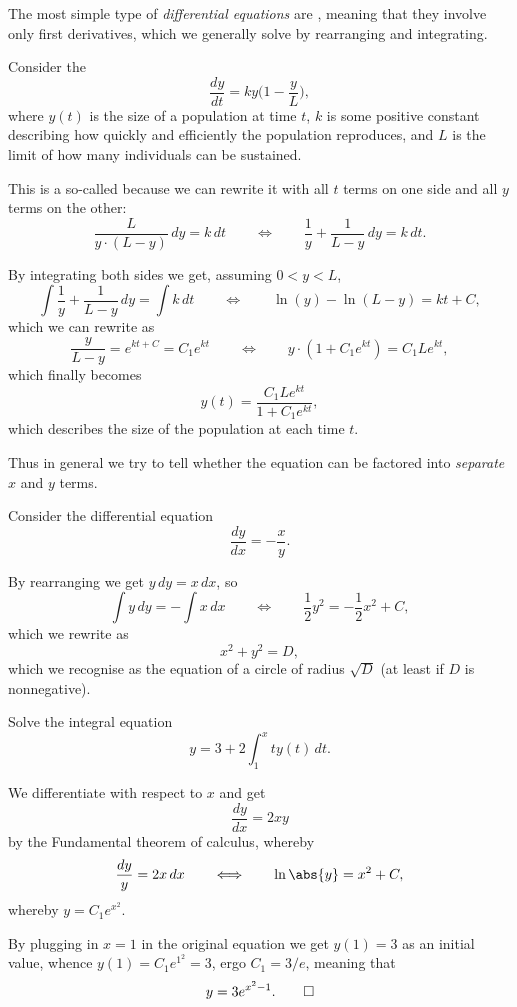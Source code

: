 

The most simple type of \emph{differential equations} are , meaning that they involve only first derivatives, which we generally solve by rearranging and integrating.

\begin{example}
	Consider the 
	\[
		\frac{d y}{d t} = k y \Big ( 1 - \frac{y}{L} \Big ),
	\]
	where $y(t)$ is the size of a population at time $t$, $k$ is some positive constant describing how quickly and efficiently the population reproduces, and $L$ is the limit of how many individuals can be sustained.

	This is a so-called  because we can rewrite it with all $t$ terms on one side and all $y$ terms on the other:
	\[
		\frac{L}{y \cdot (L - y)} \, d y = k \, d t \qquad \Longleftrightarrow \qquad \frac{1}{y} + \frac{1}{L - y} \, d y = k \, d t.
	\]

	\noindent
	By integrating both sides we get, assuming $0 < y < L$,
	\[
		\int \frac{1}{y} + \frac{1}{L - y} \, d y = \int k \, d t \qquad \Longleftrightarrow \qquad \ln(y) - \ln(L - y) = k t + C,
	\]
	which we can rewrite as
	\[
		\frac{y}{L - y} = e^{k t + C} = C_1 e^{k t} \qquad \Longleftrightarrow \qquad y \cdot (1 + C_1 e^{k t}) = C_1 L e^{k t},
	\]
	which finally becomes
	\[
		y(t) = \frac{C_1 L e^{k t}}{1 + C_1 e^{k t}},
	\]
	which describes the size of the population at each time $t$.
\end{example}

\noindent
Thus in general we try to tell whether the equation can be factored into \emph{separate} $x$ and $y$ terms.

\begin{example}
	Consider the differential equation
	\[
		\frac{d y}{d x} = - \frac{x}{y}.
	\]

	\noindent
	By rearranging we get $y \, dy = x \, d x$, so
	\[
		\int y \, d y = - \int x \, d x \qquad \Longleftrightarrow \qquad \frac{1}{2} y^2 = - \frac{1}{2} x^2 + C,
	\]
	which we rewrite as
	\[
		x^2 + y^2 = D,
	\]
	which we recognise as the equation of a circle of radius $\sqrt{D}$ (at least if $D$ is nonnegative).
\end{example}

\begin{example}
	Solve the integral equation
	\[
		y = 3 + 2 \int_1^x t y(t) \, d t.
	\]

	\noindent
	We differentiate with respect to $x$ and get
	\[
		\frac{d y}{d x} = 2 x y
	\]
	by the Fundamental theorem of calculus, whereby
	\[
		\frac{d y}{y} = 2 x \, d x \qquad \Longleftrightarrow \qquad \ln\abs{y} = x^2 + C,
	\]
	whereby $y = C_1 e^{x^2}$.

	By plugging in $x = 1$ in the original equation we get $y(1) = 3$ as an initial value, whence $y(1) = C_1 e^{1^2} = 3$, ergo $C_1 = 3 / e$, meaning that
	\[
		y = 3 e^{x^2 - 1}. \qedhere
	\]
\end{example}

